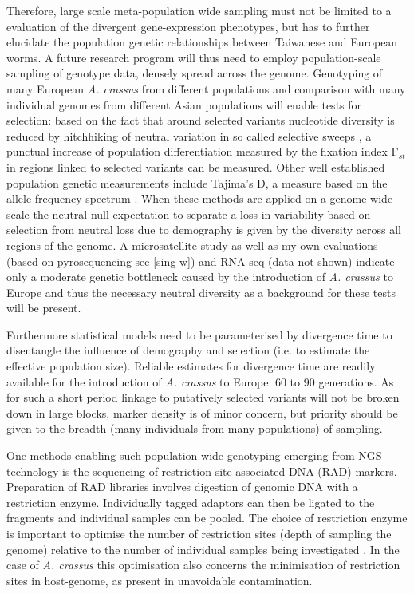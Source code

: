 Therefore, large scale meta-population wide sampling must not be
limited to a evaluation of the divergent gene-expression phenotypes,
but has to further elucidate the population genetic relationships
between Taiwanese and European worms. A future research program will
thus need to employ population-scale sampling of genotype data, densely
spread across the genome. Genotyping of many European
\textit{A. crassus} from different populations and comparison with
many individual genomes from different Asian populations will enable
tests for selection: based on the fact that around selected variants
nucleotide diversity is reduced by hitchhiking of neutral variation in
so called selective sweeps \cite{pmid16251466}, a punctual increase of
population differentiation measured by the fixation index F$_{st}$
\cite{wright1949genetical} in regions linked to selected variants can
be measured. Other well established population genetic measurements
include Tajima's D, a measure based on the allele frequency spectrum
\cite{pmid2513255}. When these methods are applied on a genome wide
scale the neutral null-expectation to separate a loss in variability
based on selection from neutral loss due to demography is given by the
diversity across all regions of the genome. A microsatellite study
\cite{wielgoss_population_2008} as well as my own evaluations (based
on pyrosequencing see \ref{sing-w}) and RNA-seq (data not shown)
indicate only a moderate genetic bottleneck caused by the introduction
of \textit{A. crassus} to Europe and thus the necessary neutral
diversity as a background for these tests will be present.

Furthermore statistical models need to be parameterised by divergence
time to disentangle the influence of demography and selection (i.e. to
estimate the effective population size). Reliable estimates for
divergence time are readily available for the introduction of
\textit{A. crassus} to Europe: 60 to 90 generations. As for such a
short period linkage to putatively selected variants will not be
broken down in large blocks, marker density is of minor concern, but
priority should be given to the breadth (many individuals from many
populations) of sampling.

One methods enabling such population wide genotyping emerging from NGS
technology is the sequencing of restriction-site associated DNA (RAD)
markers. Preparation of RAD libraries involves digestion of genomic
DNA with a restriction enzyme. Individually tagged adaptors can then
be ligated to the fragments and individual samples can be pooled. The
choice of restriction enzyme is important to optimise the number of
restriction sites (depth of sampling the genome) relative to the
number of individual samples being investigated
\cite{pmid18852878}. In the case of \textit{A. crassus} this
optimisation also concerns the minimisation of restriction sites in
host-genome, as present in unavoidable contamination. 


